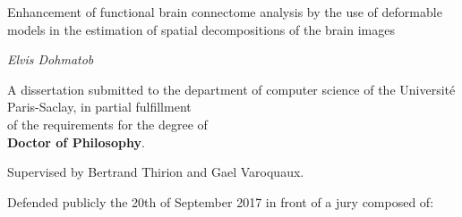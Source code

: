 \documentclass[nobib, a4paper, notoc, twoside, justified, openany]{tufte-book}
\begin{document}
\begin{titlepage}
\begin{fullwidth}
\begin{center}

\vspace{2pc}
{ \Huge
{\color{msblue} {Enhancement of functional brain connectome analysis by the use of deformable
models in the estimation of spatial decompositions of the brain images}} \\[0.5cm]
}




\vspace{3pc}
{\Huge \it Elvis Dohmatob} \\

\vspace{3pc}



{\LARGE A dissertation submitted to the department of computer science of the Universit\'e Paris-Saclay, in partial fulfillment
  \\of the requirements for the degree of \\  \vspace{10pt} 
  \textbf{Doctor of Philosophy}.}\\
\vspace{1pc}

{\LARGE Supervised by {Bertrand Thirion} and {Gael Varoquaux}.}


\vspace{2pc}
{\LARGE Defended publicly the 20th of September 2017 in front of a jury composed of:}
\vspace{2pc}



\end{center}
\end{fullwidth}
\end{titlepage}
\end{document}
